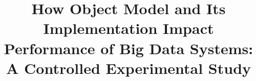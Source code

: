 
\title{How Object Model and Its Implementation Impact Performance of Big Data Systems: A Controlled Experimental Study}

\let\WriteBookmarks\relax
\def\floatpagepagefraction{1}
\def\textpagefraction{.001}